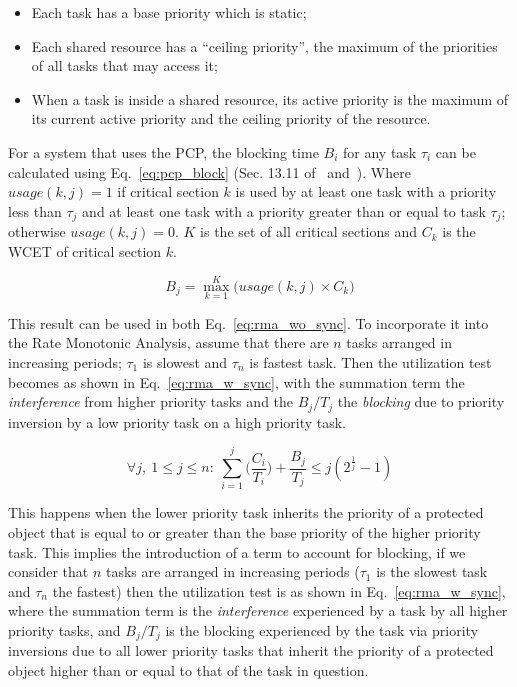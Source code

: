 \begin{itemize}
\item{Each task has a base priority which is static;}
\item{Each shared resource has a ``ceiling priority'', the maximum of
  the priorities of all tasks that may access it;}
\item{When a task is inside a shared resource, its active priority is
  the maximum of its current active priority and the ceiling priority
  of the resource.}
\end{itemize}

For a system that uses the PCP, the blocking time $B_i$ for any task
$\tau_i$ can be calculated using
Eq.~\ref{eq:pcp_block} (Sec. 13.11 of~\cite{burns-rtspl}
and~\cite{sha@toc90}). Where $usage(k, j) = 1$ if critical section $k$
is used by at least one task with a priority less than $\tau_j$ and at
least one task with a priority greater than or equal to task
$\tau_j$; otherwise $usage(k, j) = 0$. $K$ is the set of all critical
sections and $C_k$ is the WCET of critical section $k$.

\begin{equation}
\label{eq:pcp_block}
B_j = \max_{k=1}^{K} \Big(usage(k,j)\times C_k\Big)
\end{equation}

This result can be used in both Eq.~\ref{eq:rma_wo_sync}. To
incorporate it into the Rate Monotonic Analysis, assume that there are
$n$ tasks arranged in increasing periods; $\tau_1$ is slowest and
$\tau_n$ is fastest task. Then the utilization test becomes as shown
in Eq.~\ref{eq:rma_w_sync}, with the summation term the
\emph{interference} from higher priority tasks and the $B_j/T_j$ the
\emph{blocking} due to priority inversion by a low priority task on a
high priority task.

\begin{equation}
\label{eq:rma_w_sync}
\forall j,\ 1 \le j \le n:\ \sum_{i=1}^j
\bigg(\frac{C_i}{T_i}\bigg)+\frac{B_j}{T_j} \le j(2^{\frac{1}{j}}-1)
\end{equation}

This happens when the lower priority task inherits the priority
of a protected object that is equal to or greater than the base
priority of the higher priority task. This implies the introduction of
a term to account for blocking, if we consider that $n$ tasks are
arranged in increasing periods ($\tau_1$ is the slowest task and
$\tau_n$ the fastest) then the utilization test is as shown in
Eq.~\ref{eq:rma_w_sync}, where the summation term is the
\emph{interference} experienced by a task by all higher priority
tasks, and $B_j/T_j$ is the blocking experienced by the task via
priority inversions due to all lower priority tasks that inherit the
priority of a protected object higher than or equal to that of the
task in question.

